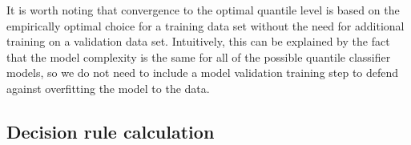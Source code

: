 It is worth noting that convergence to the optimal quantile level is based on
the empirically optimal choice for a training data set without the need for
additional training on a validation data set.  Intuitively, this can be
explained by the fact that the model complexity is the same for all of the
possible quantile classifier models, so we do not need to include a model
validation training step to defend against overfitting the model to the data.





\subsection{Decision rule calculation}
\label{sec:empirical-quantile-classifier-results}

